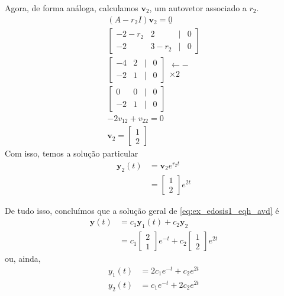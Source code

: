 \begin{ex}
  Agora, de forma análoga, calculamos $\pmb{v}_2$, um autovetor associado a $r_2$.
  \begin{gather}
    (A-r_2I)\pmb{v}_2 = \underline{0} \\
    \begin{bmatrix}
      -2-r_2 & 2 & | & 0 \\
      -2 & 3-r_2 & | & 0
    \end{bmatrix} \\
    \begin{bmatrix}
      -4 & 2 & | & 0 \\
      -2 & 1 & | & 0
    \end{bmatrix}
    \begin{matrix}
      \leftarrow - \\
      \times 2
    \end{matrix}\\
    \begin{bmatrix}
      0 & 0 & | & 0 \\
      -2 & 1 & | & 0
    \end{bmatrix}\\
    -2v_{12} + v_{22} = 0 \\
    \pmb{v}_2 =
    \begin{bmatrix}
      1 \\
      2
    \end{bmatrix}
  \end{gather}
  Com isso, temos a solução particular
  \begin{align}
    \pmb{y}_2(t) &= \pmb{v}_2e^{r_2t} \\
    &=
    \begin{bmatrix}
      1\\
      2
    \end{bmatrix}e^{2t}
  \end{align}

  De tudo isso, concluímos que a solução geral de \eqref{eq:ex_edosis1_eqh_avd} é
  \begin{align}
    \pmb{y}(t) &= c_1\pmb{y}_1(t) + c_2\pmb{y}_2 \\
    &= c_1
    \begin{bmatrix}
      2\\
      1
    \end{bmatrix}e^{-t} + c_2
    \begin{bmatrix}
      1\\
      2
    \end{bmatrix}e^{2t}
  \end{align}
  ou, ainda,
  \begin{align}
    y_1(t) &= 2c_1e^{-t} + c_2e^{2t} \\
    y_2(t) &= c_1e^{-t} + 2c_2e^{2t}
  \end{align}


\end{ex}
